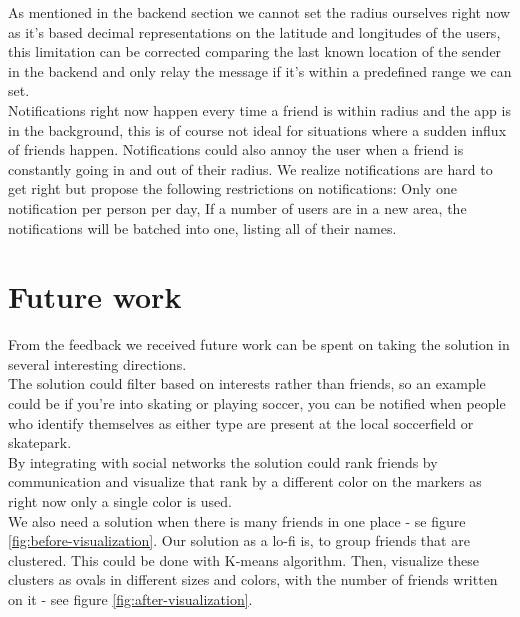 \documentclass[runningheads,a4paper]{llncs}
\begin{document}
As mentioned in the backend section we cannot set the radius ourselves right now as it's based decimal representations on the latitude and longitudes of the users, this limitation can be corrected comparing the last known location of the sender in the backend and only relay the message if it's within a predefined range we can set.\\
Notifications right now happen every time a friend is within radius and the app is in the background, this is of course not ideal for situations where a sudden influx of friends happen. Notifications could also annoy the user when a friend is constantly going in and out of their radius. We realize notifications are hard to get right but propose the following restrictions on notifications: Only one notification per person per day, If a number of users are in a new area, the notifications will be batched into one, listing all of their names.
\section{Future work}\label{future-work}
From the feedback we received future work can be spent on taking the solution in several interesting directions.\\
The solution could filter based on interests rather than friends, so an example could be if you're into skating or playing soccer, you can be notified when people who identify themselves as either type are present at the local soccerfield or skatepark.\\
By integrating with social networks the solution could rank friends by communication and visualize that rank by a different color on the markers as right now only a single color is used.\\
We also need a solution when there is many friends in one place - se figure \ref{fig:before-visualization}. Our solution as a lo-fi is, to group friends that are clustered. This could be done with K-means algorithm. Then, visualize these clusters as ovals in different sizes and colors, with the number of friends written on it - see figure \ref{fig:after-visualization}.\\
\end{document}
